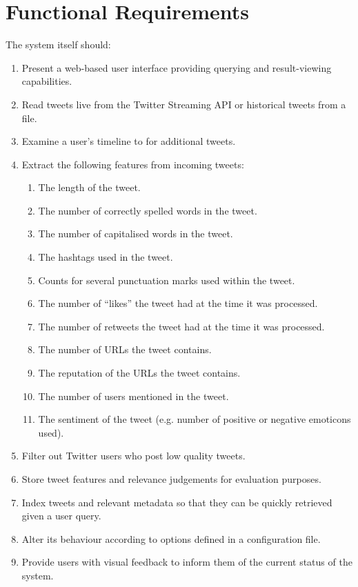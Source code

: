 \documentclass{l4proj}
\begin{document}
    \section{Functional Requirements}
  
    The system itself should:
    \begin{enumerate}
    \item Present a web-based user interface providing querying and result-viewing capabilities.
    \item Read tweets live from the Twitter Streaming API or historical tweets from a file.
    \item Examine a user's timeline to for additional tweets.
    \item Extract the following features from incoming tweets:
        \begin{enumerate}
        \item The length of the tweet.
        \item The number of correctly spelled words in the tweet.
        \item The number of capitalised words in the tweet.
        \item The hashtags used in the tweet.
        \item Counts for several punctuation marks used within the tweet.
        \item The number of ``likes'' the tweet had at the time it was processed. 
        \item The number of retweets the tweet had at the time it was processed.
        \item The number of URLs the tweet contains.
        \item The reputation of the URLs the tweet contains.
        \item The number of users mentioned in the tweet.
        \item The sentiment of the tweet (e.g. number of positive or negative emoticons used).
        \end{enumerate} 
    \item Filter out Twitter users who post low quality tweets.
    \item Store tweet features and relevance judgements for evaluation purposes.
    \item Index tweets and relevant metadata so that they can be quickly retrieved given a user query.
    \item Alter its behaviour according to options defined in a configuration file.
    \item Provide users with visual feedback to inform them of the current status of the system.
    \end{enumerate}
\end{document}
